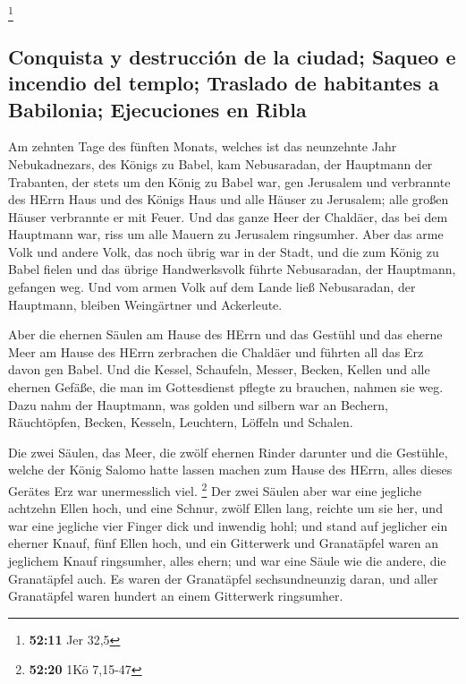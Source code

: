 \footnote{\textbf{52:11} Jer 32,5}

\hypertarget{conquista-y-destrucciuxf3n-de-la-ciudad-saqueo-e-incendio-del-templo-traslado-de-habitantes-a-babilonia-ejecuciones-en-ribla}{%
\subsection{Conquista y destrucción de la ciudad; Saqueo e incendio del
templo; Traslado de habitantes a Babilonia; Ejecuciones en
Ribla}\label{conquista-y-destrucciuxf3n-de-la-ciudad-saqueo-e-incendio-del-templo-traslado-de-habitantes-a-babilonia-ejecuciones-en-ribla}}

 Am zehnten Tage des fünften Monats, welches ist das
neunzehnte Jahr Nebukadnezars, des Königs zu Babel, kam Nebusaradan, der
Hauptmann der Trabanten, der stets um den König zu Babel war, gen
Jerusalem  und verbrannte des HErrn Haus und des Königs
Haus und alle Häuser zu Jerusalem; alle großen Häuser verbrannte er mit
Feuer.  Und das ganze Heer der Chaldäer, das bei dem
Hauptmann war, riss um alle Mauern zu Jerusalem ringsumher.
 Aber das arme Volk und andere Volk, das noch übrig war
in der Stadt, und die zum König zu Babel fielen und das übrige
Handwerksvolk führte Nebusaradan, der Hauptmann, gefangen weg.
 Und vom armen Volk auf dem Lande ließ Nebusaradan, der
Hauptmann, bleiben Weingärtner und Ackerleute.

 Aber die ehernen Säulen am Hause des HErrn und das
Gestühl und das eherne Meer am Hause des HErrn zerbrachen die Chaldäer
und führten all das Erz davon gen Babel.  Und die Kessel,
Schaufeln, Messer, Becken, Kellen und alle ehernen Gefäße, die man im
Gottesdienst pflegte zu brauchen, nahmen sie weg.  Dazu
nahm der Hauptmann, was golden und silbern war an Bechern, Räuchtöpfen,
Becken, Kesseln, Leuchtern, Löffeln und Schalen.

 Die zwei Säulen, das Meer, die zwölf ehernen Rinder
darunter und die Gestühle, welche der König Salomo hatte lassen machen
zum Hause des HErrn, alles dieses Gerätes Erz war unermesslich viel.
\footnote{\textbf{52:20} 1Kö 7,15-47}  Der zwei Säulen
aber war eine jegliche achtzehn Ellen hoch, und eine Schnur, zwölf Ellen
lang, reichte um sie her, und war eine jegliche vier Finger dick und
inwendig hohl;  und stand auf jeglicher ein eherner
Knauf, fünf Ellen hoch, und ein Gitterwerk und Granatäpfel waren an
jeglichem Knauf ringsumher, alles ehern; und war eine Säule wie die
andere, die Granatäpfel auch.  Es waren der Granatäpfel
sechsundneunzig daran, und aller Granatäpfel waren hundert an einem
Gitterwerk ringsumher.

